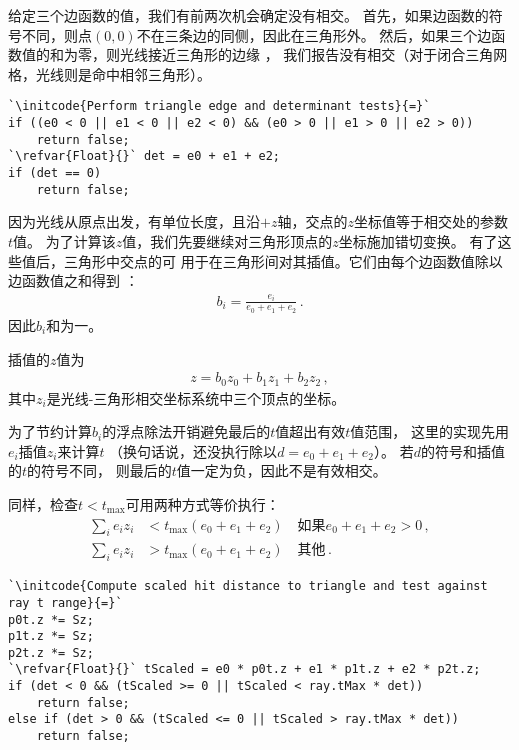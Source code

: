 给定三个边函数的值，我们有前两次机会确定没有相交。
首先，如果边函数的符号不同，则点$(0,0)$不在三条边的同侧，因此在三角形外。
然后，如果三个边函数值的和为零，则光线接近三角形的边缘
，
我们报告没有相交（对于闭合三角网格，光线则是命中相邻三角形）。
\begin{lstlisting}
`\initcode{Perform triangle edge and determinant tests}{=}`
if ((e0 < 0 || e1 < 0 || e2 < 0) && (e0 > 0 || e1 > 0 || e2 > 0))
    return false;
`\refvar{Float}{}` det = e0 + e1 + e2;
if (det == 0)
    return false;
\end{lstlisting}

因为光线从原点出发，有单位长度，且沿$+z$轴，交点的$z$坐标值等于相交处的参数$t$值。
为了计算该$z$值，我们先要继续对三角形顶点的$z$坐标施加错切变换。
有了这些值后，三角形中交点的可
用于在三角形间对其插值。它们由每个边函数值除以边函数值之和得到
：
\begin{align*}
    b_i=\frac{e_i}{e_0+e_1+e_2}\, .
\end{align*}
因此$b_i$和为一。

插值的$z$值为
\begin{align*}
    z=b_0z_0+b_1z_1+b_2z_2\, ,
\end{align*}
其中$z_i$是光线-三角形相交坐标系统中三个顶点的坐标。

为了节约计算$b_i$的浮点除法开销避免最后的$t$值超出有效$t$值范围，
这里的实现先用$e_i$插值$z_i$来计算$t$
（换句话说，还没执行除以$d=e_0+e_1+e_2$）。
若$d$的符号和插值的$t$的符号不同，
则最后的$t$值一定为负，因此不是有效相交。

同样，检查$t<t_{\max}$可用两种方式等价执行：
\begin{align*}
    \sum\limits_i{e_iz_i} & <t_{\max}(e_0+e_1+e_2)\quad\text{如果}e_0+e_1+e_2>0\, , \\
    \sum\limits_i{e_iz_i} & >t_{\max}(e_0+e_1+e_2)\quad\text{其他}\, .
\end{align*}
\begin{lstlisting}
`\initcode{Compute scaled hit distance to triangle and test against ray t range}{=}`
p0t.z *= Sz;
p1t.z *= Sz;
p2t.z *= Sz;
`\refvar{Float}{}` tScaled = e0 * p0t.z + e1 * p1t.z + e2 * p2t.z;
if (det < 0 && (tScaled >= 0 || tScaled < ray.tMax * det))
    return false;
else if (det > 0 && (tScaled <= 0 || tScaled > ray.tMax * det))
    return false;
\end{lstlisting}

